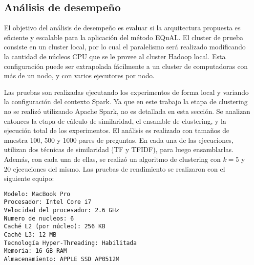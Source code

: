 \subsection{Análisis de desempeño}

El objetivo del análisis de desempeño es evaluar si la arquitectura propuesta es eficiente y escalable para la aplicación del método EQuAL. El cluster de prueba consiste en un cluster local, por lo cual el paralelismo será realizado modificando la cantidad de núcleos CPU que se le provee al cluster Hadoop local. Esta configuración puede ser extrapolada fácilmente a un cluster de computadoras con más de un nodo, y con varios ejecutores por nodo.

\bigskip Las pruebas son realizadas ejecutando los experimentos de forma local y variando la configuración del contexto Spark. Ya que en este trabajo la etapa de clustering no se realizó utilizando Apache Spark, no es detallada en esta sección. Se analizan entonces la etapa de cálculo de similaridad, el ensamble de clustering, y la ejecución total de los experimentos. El análisis es realizado con tamaños de muestra 100, 500 y 1000 pares de preguntas. En cada una de las ejecuciones, utilizan dos técnicas de similaridad (TF y TFIDF), para luego ensamblarlas. Además, con cada una de ellas, se realizó un algoritmo de clustering con \(k = 5\) y \(20\) ejecuciones del mismo. Las pruebas de rendimiento se realizaron con el siguiente equipo:

\begin{verbatim}
Modelo: MacBook Pro
Procesador: Intel Core i7
Velocidad del procesador: 2.6 GHz
Numero de nucleos: 6
Caché L2 (por núcleo): 256 KB
Caché L3: 12 MB
Tecnología Hyper-Threading: Habilitada
Memoria: 16 GB RAM
Almacenamiento: APPLE SSD AP0512M
\end{verbatim}

